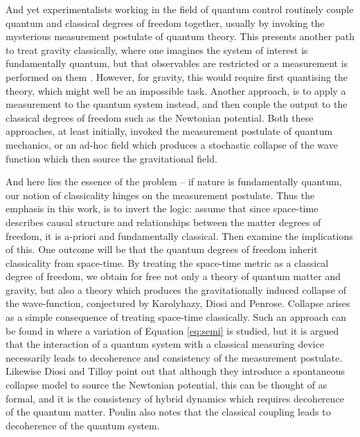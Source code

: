 \documentclass[aps,pra,showpacs,citeautoscript,amsmath,amssymb,floatfix,superscriptaddress,bbm, verbatim,amsfonts,changes,12pt,nofootinbib,longbibliography]{revtex4-2}
\begin{document}
And yet experimentalists working in the field of quantum control routinely couple quantum and classical degrees of freedom together, usually by invoking the mysterious measurement postulate of quantum theory. This presents another path to treat gravity classically, where one 
imagines the system of interest is fundamentally quantum, but that observables are restricted or a measurement is performed on them
\cite{jauch1964problem,diosi1998coupling,diosi2000quantum,peres2001hybrid}. However, for gravity, this would require first quantising the theory, which might well be an impossible task. Another approach, is to apply a measurement to the quantum system instead, and then couple the output to the classical degrees of freedom such as the Newtonian potential\cite{kafri2014classical,tilloy2016sourcing,tilloy2017principle,dowker2008dynamical}.  Both these approaches, at least initially, invoked the measurement postulate of quantum mechanics, or an ad-hoc field which produces a stochastic collapse of the wave function
\cite{pearle-csl1,grw85,grw86,gisin-percival,adler2001generalized,sep-qm-collapse} which then source the gravitational field. 

And here lies the essence of the problem -- if nature is fundamentally quantum, our notion of classicality hinges on the measurement postulate. Thus the emphasis in this work, is to invert the logic: assume that since space-time describes causal structure and relationships between the matter degrees of freedom, it is a-priori and fundamentally classical. Then examine the implications of this. One outcome will be that the quantum degrees of freedom inherit classicality from space-time. By treating the space-time metric as a classical degree of freedom, we obtain for free not only a 
theory of quantum matter and gravity, but also a theory which produces the
 gravitationally induced collapse of the wave-function, conjectured by Karolyhazy, Diosi and Penrose\cite{karolyhazy1966gravitation,diosi1989models,penrose1996gravity}\cite{penrose_foot}. Collapse arises as a simple consequence of treating space-time classically. Such an approach can be found in \cite{hall2005interacting} where a variation of Equation \eqref{eq:semi} is studied, but it is argued that the interaction of a quantum system with a classical measuring device necessarily leads to decoherence and consistency of the measurement postulate. Likewise Diosi and Tilloy\cite{tilloy2016sourcing,tilloy2017principle} point out that although they introduce a spontaneous collapse model to source the Newtonian potential, this can be thought of as formal, and it is the consistency of hybrid dynamics which requires decoherence of the quantum matter.  Poulin \cite{poulinKITP} also notes that the classical coupling leads to decoherence of the quantum system.
 
\end{document}
